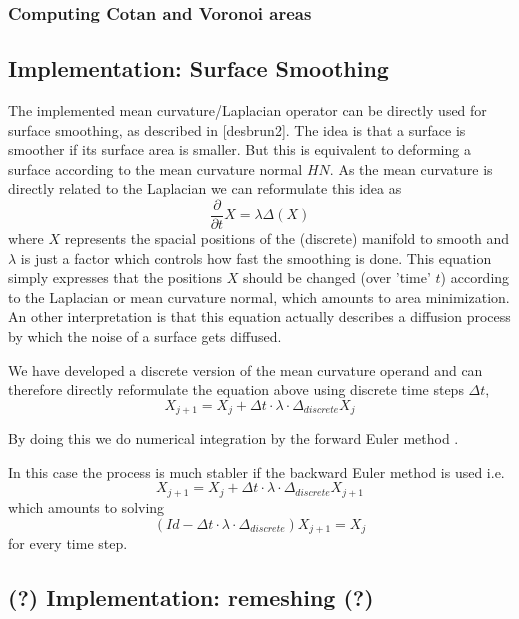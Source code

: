 
\subsubsection*{Computing Cotan and Voronoi areas}

\subsection{Implementation: Surface Smoothing}
The implemented mean curvature/Laplacian operator can be directly used for surface smoothing, as described in [desbrun2]. The idea is that a surface is smoother if its surface area is smaller. But this is equivalent to deforming a surface according to the mean curvature normal $HN$. As the mean curvature is directly related to the Laplacian we can reformulate this idea as 
\[\frac{\partial}{\partial t} X = \lambda \Delta (X)\]
where $X$ represents the spacial positions of the (discrete) manifold to smooth and $\lambda$ is just a factor which controls how fast the smoothing is done. This equation simply expresses that the positions $X$ should be changed (over 'time' $t$) according to the Laplacian or mean curvature normal, which amounts to area minimization. 
An other interpretation is that this equation actually describes a diffusion process by which the noise of a surface gets diffused.

We have developed a discrete version of the mean curvature operand and can therefore directly reformulate the equation above using discrete time steps $\Delta t$,
\[X_{j+1} = X_{j} + \Delta t \cdot \lambda\cdot\Delta_{discrete} X_j\]

By doing this we do numerical integration by the forward Euler method . 

In this case the process is much stabler if the backward Euler method is used i.e.
\[X_{j+1} = X_{j} + \Delta t \cdot \lambda\cdot\Delta_{discrete} X_{j+1}\]
which amounts to solving
\[(Id - \Delta t \cdot \lambda\cdot\Delta_{discrete}) X_{j+1} = X_{j}\]
for every time step. 


\subsection{(?) Implementation: remeshing (?)}
